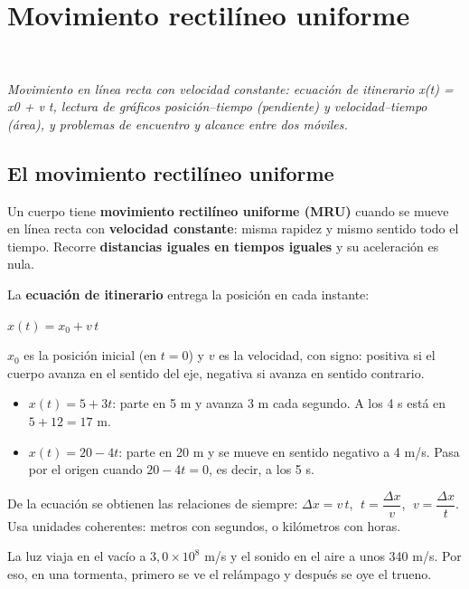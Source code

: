 \section[Movimiento rectilíneo uniforme]{Movimiento rectilíneo uniforme}
\modcomun\ \ {\color{gris}\itshape Movimiento en línea recta con velocidad constante: ecuación de itinerario x(t) = x0 + v t, lectura de gráficos posición--tiempo (pendiente) y velocidad--tiempo (área), y problemas de encuentro y alcance entre dos móviles.\par}
\subsection{El movimiento rectilíneo uniforme}
Un cuerpo tiene \textbf{movimiento rectilíneo uniforme (MRU)} cuando se mueve en línea recta con \textbf{velocidad constante}: misma rapidez y mismo sentido todo el tiempo. Recorre \textbf{distancias iguales en tiempos iguales} y su aceleración es nula.

 

La \textbf{ecuación de itinerario} entrega la posición en cada instante:

 
\begin{center}
$x(t) = x_0 + v\,t$
\end{center}
 

$x_0$ es la posición inicial (en $t = 0$) y $v$ es la velocidad, con signo: positiva si el cuerpo avanza en el sentido del eje, negativa si avanza en sentido contrario.

 
\begin{itemize}
  \item $x(t) = 5 + 3t$: parte en 5 m y avanza 3 m cada segundo. A los 4 s está en $5 + 12 = 17$ m.
  \item $x(t) = 20 - 4t$: parte en 20 m y se mueve en sentido negativo a 4 m/s. Pasa por el origen cuando $20 - 4t = 0$, es decir, a los 5 s.
\end{itemize}
  
\begin{clave}[{Recuerda}] De la ecuación se obtienen las relaciones de siempre: $\Delta x = v\,t$, $\;t = \dfrac{\Delta x}{v}$, $\;v = \dfrac{\Delta x}{t}$. Usa unidades coherentes: metros con segundos, o kilómetros con horas.\end{clave}
 
\begin{ejemplo} La luz viaja en el vacío a $3{,}0\times10^8$ m/s y el sonido en el aire a unos 340 m/s. Por eso, en una tormenta, primero se ve el relámpago y después se oye el trueno.\end{ejemplo}
